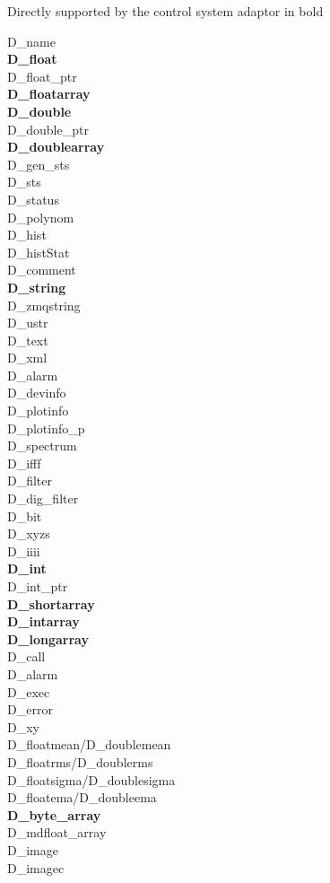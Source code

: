 \documentclass[11pt,a4paper]{scrartcl}
\begin{document}
Directly supported by the control system adaptor in bold
\begin{multicols}{3}
\noindent D\_name \\
\textbf{D\_float}\\
D\_float\_ptr \\
\textbf{D\_floatarray}\\
\textbf{D\_double}\\
D\_double\_ptr \\
\textbf{D\_doublearray}\\
D\_gen\_sts \\
D\_sts \\
D\_status \\
D\_polynom \\
D\_hist \\
D\_histStat \\
D\_comment \\
\textbf{D\_string}\\
D\_zmqstring \\
D\_ustr \\
D\_text \\
D\_xml \\
D\_alarm \\
D\_devinfo \\
D\_plotinfo \\
D\_plotinfo\_p \\
D\_spectrum \\
D\_ifff \\
D\_filter \\
D\_dig\_filter \\
D\_bit \\
D\_xyzs \\
D\_iiii \\
\textbf{D\_int}\\
D\_int\_ptr \\
\textbf{D\_shortarray}\\
\textbf{D\_intarray}\\
\textbf{D\_longarray}\\
D\_call \\
D\_alarm \\
D\_exec \\
D\_error \\
D\_xy \\
D\_floatmean/D\_doublemean \\
D\_floatrms/D\_doublerms \\
D\_floatsigma/D\_doublesigma \\
D\_floatema/D\_doubleema \\
\textbf{D\_byte\_array}\\
D\_mdfloat\_array \\
D\_image \\
D\_imagec
\end{multicols}
\end{document}

